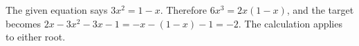 The given equation says $3x^2=1-x$. Therefore $6x^3=2x(1-x)$, and the target becomes $2x-3x^2-3x-1=-x-(1-x)-1=\boxed{-2}$. The calculation applies to either root.
